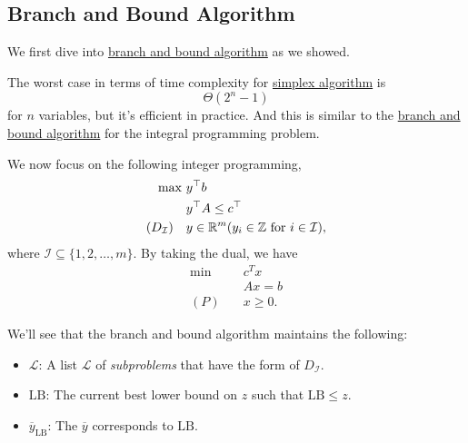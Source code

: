 \subsection{Branch and Bound Algorithm}
We first dive into \hyperref[eg:branch-and-bound]{branch and bound algorithm} as we showed.
\begin{prev}
	The worst case in terms of time complexity for \hyperref[algo:simplex-algorithm]{simplex algorithm} is
	\[
		\Theta(2^n - 1)
	\]
	for \(n\) variables, but it's efficient in practice. And this is similar to
	the \hyperref[eg:branch-and-bound]{branch and bound algorithm} for the integral programming problem.
\end{prev}

We now focus on the following integer programming,
\begin{align*}
	\max~                   & y^{\top}b                                                                                           \\
	                        & y^{\top}A\leq c^{\top}                                                                              \\
	(D_{\mathcal{I} })\quad & y\in\mathbb{\MakeUppercase{R}}^m(y_{i}\in\mathbb{\MakeUppercase{Z}} \text{ for } i\in \mathcal{I}),
\end{align*}
where \(\mathcal{I} \subseteq \{1, 2, \ldots , m\}\). By taking the dual, we have
\begin{align*}
	\min~    & c^Tx     \\
	         & Ax = b   \\
	(P)\quad & x\geq 0.
\end{align*}

We'll see that the branch and bound algorithm maintains the following:
\begin{itemize}
	\item \(\mathcal{L} \): A list \(\mathcal{L} \) of \emph{subproblems} that have the form of \(D_{\mathcal{I} }\).
	\item \(\mathrm{LB} \): The current best lower bound on \(z\) such that \(\mathrm{LB}\leq z \).
	\item \(\overline{y}_{\mathrm{LB}}\): The \(\overline{y}\) corresponds to \(\mathrm{LB}\).
\end{itemize}

